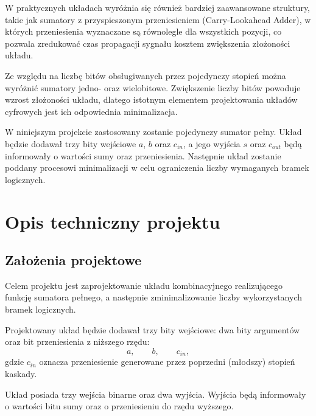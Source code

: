\documentclass[12pt,a4paper]{article}
\begin{document}
W praktycznych układach wyróżnia się również bardziej zaawansowane struktury, takie jak sumatory z przyspieszonym przeniesieniem (Carry-Lookahead Adder), w których przeniesienia wyznaczane są równolegle dla wszystkich pozycji, co pozwala zredukować czas propagacji sygnału kosztem zwiększenia złożoności układu.

Ze względu na liczbę bitów obsługiwanych przez pojedynczy stopień można wyróżnić sumatory jedno- oraz wielobitowe. Zwiększenie liczby bitów powoduje wzrost złożoności układu, dlatego istotnym elementem projektowania układów cyfrowych jest ich odpowiednia minimalizacja.

W niniejszym projekcie zastosowany zostanie pojedynczy sumator pełny. Układ będzie dodawał trzy bity wejściowe $a$, $b$ oraz $c_{in}$, a jego wyjścia $s$ oraz $c_{out}$ będą informowały o wartości sumy oraz przeniesienia. Następnie układ zostanie poddany procesowi minimalizacji w celu ograniczenia liczby wymaganych bramek logicznych.


\section{Opis techniczny projektu}

\subsection{Założenia projektowe}

Celem projektu jest zaprojektowanie układu kombinacyjnego realizującego funkcję sumatora pełnego, a następnie zminimalizowanie liczby wykorzystanych bramek logicznych.

Projektowany układ będzie dodawał trzy bity wejściowe: dwa bity argumentów oraz bit przeniesienia z niższego rzędu:
\begin{equation*}
a, \qquad b, \qquad c_{in},
\end{equation*}
gdzie $c_{in}$ oznacza przeniesienie generowane przez poprzedni (młodszy) stopień kaskady.

Układ posiada trzy wejścia binarne oraz dwa wyjścia. Wyjścia będą informowały o wartości bitu sumy oraz o przeniesieniu do rzędu wyższego.
\end{document}
